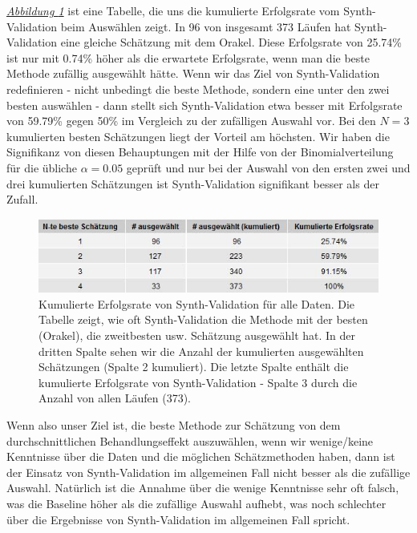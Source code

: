 \documentclass[12pt,a4paper,twoside]{scrartcl}
\numberwithin{equation}{section}
\newcommand{\reffig}[1]{\emph{\hyperref[#1]{Abbildung \ref*{#1}}}}
\begin{document}
\noindent
\reffig{fig:allRunsGrid} ist eine Tabelle, die uns die kumulierte Erfolgsrate vom Synth-Validation beim Auswählen zeigt. In 96 von insgesamt 373 Läufen hat Synth-Validation eine gleiche Schätzung mit dem Orakel. Diese Erfolgsrate von 25.74\% ist nur mit 0.74\% höher als die erwartete Erfolgsrate, wenn man die beste Methode zufällig ausgewählt hätte. Wenn wir das Ziel von Synth-Validation redefinieren - nicht unbedingt die beste Methode, sondern eine unter den zwei besten auswählen - dann stellt sich Synth-Validation etwa besser mit Erfolgsrate von 59.79\% gegen 50\% im Vergleich zu der zufälligen Auswahl vor. Bei den $N=3$ kumulierten besten Schätzungen liegt der Vorteil am höchsten. Wir haben die Signifikanz von diesen Behauptungen mit der Hilfe von der Binomialverteilung für die übliche $\alpha = 0.05$ geprüft und nur bei der Auswahl von den ersten zwei und drei kumulierten Schätzungen ist Synth-Validation signifikant besser als der Zufall. \par

\begin{center}
\begin{figure}[h]
    \centering
    \includegraphics[height=0.2\textwidth, width=1\textwidth]{figures/plots/allRunsGrid.jpeg}
   \vspace{1mm} 
    \caption[Kumulierte Erfolgsrate von Synth-Validation für alle Daten]{Kumulierte Erfolgsrate von Synth-Validation für alle Daten. Die Tabelle zeigt, wie oft Synth-Validation die Methode mit der besten (Orakel), die zweitbesten usw. Schätzung ausgewählt hat. In der dritten Spalte sehen wir die Anzahl der kumulierten ausgewählten Schätzungen (Spalte 2 kumuliert). Die letzte Spalte enthält die kumulierte Erfolgsrate von Synth-Validation - Spalte 3 durch die Anzahl von allen Läufen (373).}\label{fig:allRunsGrid}
  \end{figure}
\end{center}

\noindent
Wenn also unser Ziel ist, die beste Methode zur Schätzung von dem durchschnittlichen Behandlungseffekt auszuwählen, wenn wir wenige/keine Kenntnisse über die Daten und die möglichen Schätzmethoden haben, dann ist der Einsatz von Synth-Validation im allgemeinen Fall nicht besser als die zufällige Auswahl. Natürlich ist die Annahme über die wenige Kenntnisse sehr oft falsch, was die Baseline höher als die zufällige Auswahl aufhebt, was noch schlechter über die Ergebnisse von Synth-Validation im allgemeinen Fall spricht.\par
\end{document}
